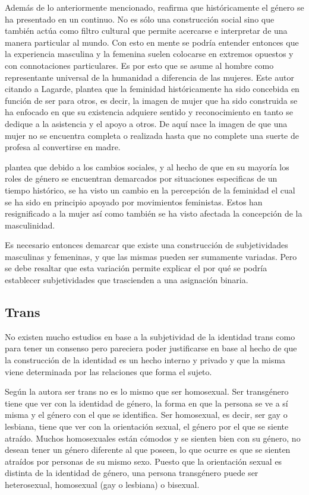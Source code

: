 Además de lo anteriormente mencionado, \textcite{Martinez-Herrera2007} reafirma
que históricamente el género se ha presentado en un continuo. No es sólo una
construcción social sino que también actúa como filtro cultural que permite
acercarse e interpretar de una manera particular al mundo. Con esto en mente se
podría entender entonces que la experiencia masculina y la femenina suelen
colocarse en extremos opuestos y con connotaciones particulares. Es por esto que
se asume al hombre como representante universal de la humanidad a diferencia de
las mujeres. Este autor citando a Lagarde, plantea que la feminidad
históricamente ha sido concebida en función de ser para otros, es decir, la
imagen de mujer que ha sido construida se ha enfocado en que su existencia
adquiere sentido y reconocimiento en tanto se dedique a la asistencia y el apoyo
a otros. De aquí nace la imagen de que una mujer no se encuentra completa o
realizada hasta que no complete una suerte de profesa al convertirse en madre.

\textcite{Lagarde1990} plantea que debido a los cambios sociales, y al hecho de
que en su mayoría los roles de género se encuentran demarcados por situaciones
especificas de un tiempo histórico, se ha visto un cambio en la percepción de la
feminidad el cual se ha sido en principio apoyado por movimientos feministas.
Estos han resignificado a la mujer así como también se ha visto afectada la
concepción de la masculinidad.

Es necesario entonces demarcar que existe una construcción de subjetividades
masculinas y femeninas, y que las mismas pueden ser sumamente variadas. Pero se
debe resaltar que esta variación permite explicar el por qué se podría
establecer subjetividades que trascienden a una asignación binaria.

\subsection{Trans}

No existen mucho estudios en base a la subjetividad de la identidad trans como
para tener un consenso pero pareciera poder justificarse en base al hecho de que
la construcción de la identidad es un hecho interno y privado y que la misma
viene determinada por las relaciones que forma el sujeto.

Según la autora \textcite{Dowshen-Atanda2014} ser trans no es lo mismo que ser
homosexual. Ser transgénero tiene que ver con la identidad de género, la forma
en que la persona se ve a sí misma y el género con el que se identifica. Ser
homosexual, es decir, ser gay o lesbiana, tiene que ver con la orientación
sexual, el género por el que se siente atraído. Muchos homosexuales están
cómodos y se sienten bien con su género, no desean tener un género diferente al
que poseen, lo que ocurre es que se sienten atraídos por personas de su mismo
sexo. Puesto que la orientación sexual es distinta de la identidad de género,
una persona transgénero puede ser heterosexual, homosexual (gay o lesbiana) o
bisexual.

